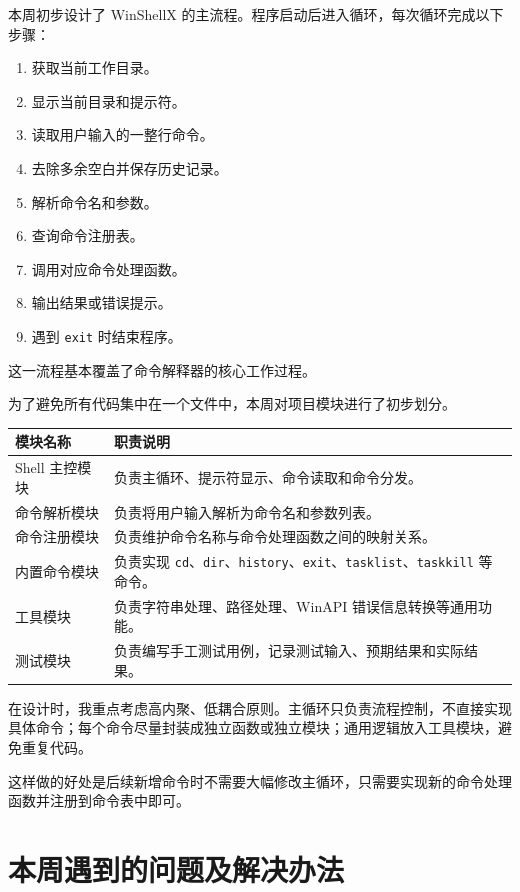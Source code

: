 \documentclass[UTF8]{ctexart}
\begin{document}
本周初步设计了 WinShellX 的主流程。程序启动后进入循环，每次循环完成以下步骤：

\begin{enumerate}
  \item 获取当前工作目录。
  \item 显示当前目录和提示符。
  \item 读取用户输入的一整行命令。
  \item 去除多余空白并保存历史记录。
  \item 解析命令名和参数。
  \item 查询命令注册表。
  \item 调用对应命令处理函数。
  \item 输出结果或错误提示。
  \item 遇到 \texttt{exit} 时结束程序。
\end{enumerate}

这一流程基本覆盖了命令解释器的核心工作过程。

为了避免所有代码集中在一个文件中，本周对项目模块进行了初步划分。

\begin{longtable}{p{4cm}p{10cm}}
\toprule
模块名称 & 职责说明 \\
\midrule
Shell 主控模块 & 负责主循环、提示符显示、命令读取和命令分发。 \\
命令解析模块 & 负责将用户输入解析为命令名和参数列表。 \\
命令注册模块 & 负责维护命令名称与命令处理函数之间的映射关系。 \\
内置命令模块 & 负责实现 \texttt{cd}、\texttt{dir}、\texttt{history}、\texttt{exit}、\texttt{tasklist}、\texttt{taskkill} 等命令。 \\
工具模块 & 负责字符串处理、路径处理、WinAPI 错误信息转换等通用功能。 \\
测试模块 & 负责编写手工测试用例，记录测试输入、预期结果和实际结果。 \\
\bottomrule
\end{longtable}

在设计时，我重点考虑高内聚、低耦合原则。主循环只负责流程控制，不直接实现具体命令；每个命令尽量封装成独立函数或独立模块；通用逻辑放入工具模块，避免重复代码。

这样做的好处是后续新增命令时不需要大幅修改主循环，只需要实现新的命令处理函数并注册到命令表中即可。

\section{本周遇到的问题及解决办法}
\end{document}
